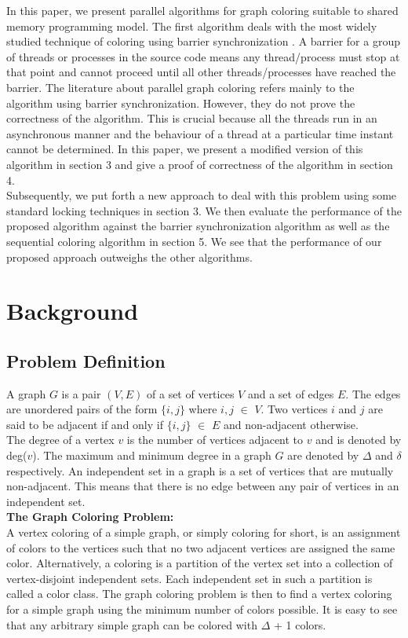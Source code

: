 \documentclass[a4paper,11pt]{article}
\begin{document}
\indent In this paper, we present parallel algorithms for graph coloring suitable to shared memory programming model. The first algorithm deals with the most widely studied technique of coloring using barrier synchronization \cite{patwary2011new,DBLP:journals/pc/CatalyurekFGHP12,boman2005scalable, DBLP:journals/concurrency/GebremedhinM00}. A barrier for a group of threads or processes in the source code means any thread/process must stop at that point and cannot proceed until all other threads/processes have reached the barrier. The literature about parallel graph coloring refers mainly to the algorithm using barrier synchronization. However, they do not prove the correctness of the algorithm. This is crucial because all the threads run in an asynchronous manner and the behaviour of a thread at a particular time instant cannot be determined. In this paper, we present a modified version of this algorithm in section 3 and give a proof of correctness of the algorithm in section 4.\\
\indent Subsequently, we put forth a new approach to deal with this problem using some standard locking techniques in section 3. We then evaluate the performance of the proposed algorithm against the barrier synchronization algorithm as well as the sequential coloring algorithm in section 5. We see that the performance of our proposed approach outweighs the other algorithms.
\section{Background}
\subsection{Problem Definition}
A graph $G$ is a pair $(V, E)$ of a set of vertices $V$ and a set of edges $E$. The edges are unordered pairs of the form $\{i, j\}$ where $i, j$ $\in$ $V$. Two vertices $i$ and $j$ are said to be adjacent if and only if $\{i, j\}$ $\in$ $E$ and non-adjacent otherwise.\\
The degree of a vertex $v$ is the number of vertices adjacent to $v$ and is denoted by deg($v$). The maximum and minimum degree in a graph $G$ are denoted by $\Delta$ and $\delta$ respectively. An independent set in a graph is a set of vertices that are mutually non-adjacent. This means that there is no edge between any pair of vertices in an independent set.\\
\newline
\textbf{The Graph Coloring Problem:}\\
A vertex coloring of a simple graph, or simply coloring for short, is an assignment of colors to the vertices such that no two adjacent vertices are assigned the same color. Alternatively, a coloring is a partition of the vertex set into a collection of vertex-disjoint independent sets. Each independent set in such a partition is called a color class. The graph coloring problem is then to find a vertex coloring for a simple graph using the minimum number of colors possible. It is easy to see that any arbitrary simple graph can be colored with $\Delta$ + 1 colors.
\end{document}
